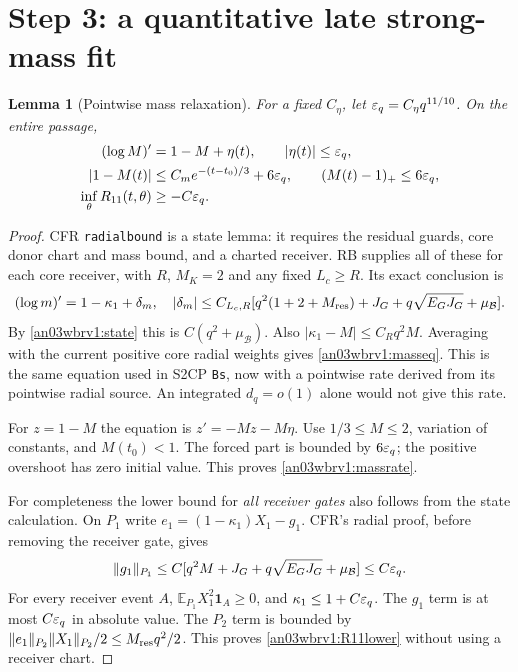 \documentclass[11pt]{article}
\numberwithin{equation}{section}
\newtheorem{lemma}[theorem]{Lemma}
\theoremstyle{remark}\newtheorem{remark}[theorem]{Remark}
\newcommand{\E}{\mathbb E}\newcommand{\dd}{\,d}
\newcommand{\one}{\mathbf1}\newcommand{\KK}{\mathcal K}
\newcommand{\BB}{\mathcal B}\newcommand{\Gp}{{G_+}}
\begin{document}
\section{Step 3: a quantitative late strong-mass fit}
\begin{lemma}[Pointwise mass relaxation]
\label{an03wbrv1:mass}
For a fixed $C_\eta$, let $\varepsilon_q=C_\eta q^{11/10}$.
On the entire passage,
\begin{align}
 (\log M)'&=1-M+\eta(t),\qquad |\eta(t)|\le\varepsilon_q,
 \label{an03wbrv1:masseq}\\
 |1-M(t)|&\le C_m e^{-(t-t_0)/3}+6\varepsilon_q,
 \qquad (M(t)-1)_+\le6\varepsilon_q,
 \label{an03wbrv1:massrate}\\
 \inf_\theta R_{11}(t,\theta)&\ge-C\varepsilon_q.
 \label{an03wbrv1:R11lower}
\end{align}
\end{lemma}
\begin{proof}
CFR \texttt{radialbound} is a state lemma: it requires the residual
guards, core donor chart and mass bound, and a charted receiver. RB
supplies all of these for each core receiver, with $R$, $M_K=2$ and
any fixed $L_c\ge R$. Its exact conclusion is
\[
 (\log m)'=1-\kappa_1+\delta_m,\quad
 |\delta_m|\le C_{L_c,R}
 [q^2(1+2+M_{\rm res})+J_G+q\sqrt{E_GJ_G}+\mu_\BB].
\]
By \eqref{an03wbrv1:state} this is $C(q^2+\mu_\BB)$.
Also $|\kappa_1-M|\le C_Rq^2M$. Averaging with the current
positive core radial weights gives \eqref{an03wbrv1:masseq}.
This is the same equation used in S2CP \texttt{Bs}, now with a
pointwise rate derived from its pointwise radial source. An integrated
$d_q=o(1)$ alone would not give this rate.

For $z=1-M$ the equation is $z'=-Mz-M\eta$.
Use $1/3\le M\le2$, variation of constants, and $M(t_0)<1$.
The forced part is bounded by $6\varepsilon_q$; the positive overshoot
has zero initial value. This proves \eqref{an03wbrv1:massrate}.

For completeness the lower bound for \emph{all receiver gates}
also follows from the state calculation. On $P_1$ write
$e_1=(1-\kappa_1)X_1-g_1$. CFR's radial proof, before removing
the receiver gate, gives
\[
 \|g_1\|_{P_1}\le C[q^2M+J_G+q\sqrt{E_GJ_G}+\mu_\BB]
                \le C\eps_q.
\]
For every receiver event $A$, $\E_{P_1}X_1^2\one_A\ge0$,
and $\kappa_1\le1+C\varepsilon_q$. The $g_1$ term is at most
$C\varepsilon_q$ in absolute value. The $P_2$ term is bounded by
$\|e_1\|_{P_2}\|X_1\|_{P_2}/2\le M_{\rm res}q^2/2$.
This proves \eqref{an03wbrv1:R11lower} without using a receiver chart.
\end{proof}
\end{document}
